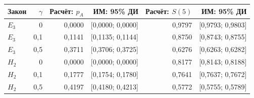 \begin{tabular}{lrrrrr}
\hline
Закон & $\gamma$ & Расчёт: $p_A$ & ИМ: 95\% ДИ & Расчёт: $S(5)$ & ИМ: 95\% ДИ \\
\hline
$E_3$ & 0 & 0,0000 & [0,0000; 0,0000] & 0,9797 & [0,9793; 0,9803] \\
$E_3$ & 0,1 & 0,1141 & [0,1135; 0,1144] & 0,8750 & [0,8743; 0,8755] \\
$E_3$ & 0,5 & 0,3711 & [0,3706; 0,3725] & 0,6276 & [0,6263; 0,6282] \\
$H_2$ & 0 & 0,0000 & [0,0000; 0,0000] & 0,8177 & [0,8143; 0,8188] \\
$H_2$ & 0,1 & 0,1777 & [0,1754; 0,1780] & 0,7641 & [0,7637; 0,7672] \\
$H_2$ & 0,5 & 0,4197 & [0,4180; 0,4213] & 0,5772 & [0,5755; 0,5789] \\
\hline
\end{tabular}

